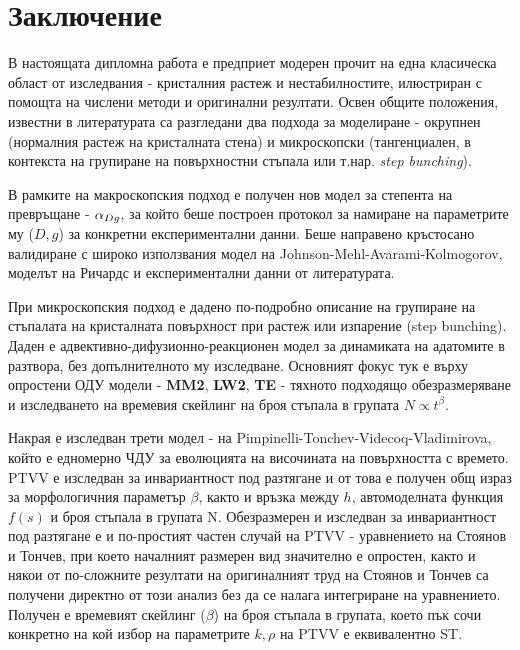 \section{Заключение}
В настоящата дипломна работа е предприет модерен прочит на една класическа област от изследвания - кристалния растеж и нестабилностите, илюстриран с помощта на числени методи и оригинални резултати. Освен общите положения, известни в литературата са разгледани два подхода за моделиране - окрупнен (нормалния растеж на кристалната стена) и микроскопски (тангенциален, в контекста на групиране на повърхностни стъпала или т.нар. \textit{step bunching}).

В рамките на макроскопския подход е получен нов модел за степента на превръщане - $\alpha_{Dg}$, за който беше построен протокол за намиране на параметрите му ($D, g$) за конкретни експериментални данни. Беше направено кръстосано валидиране с широко използвания модел на Johnson-Mehl-Avarami-Kolmogorov, моделът на Ричардс и експериментални данни от литературата.

При микроскопския подход е дадено по-подробно описание на групиране на стъпалата на кристалната повърхност при растеж или изпарение (step bunching). Даден е адвективно-дифузионно-реакционен модел за динамиката на адатомите в разтвора, без допълнителното му изследване. Основният фокус тук е върху опростени ОДУ модели - \textbf{MM2}, \textbf{LW2}, \textbf{TE} - тяхното подходящо обезразмеряване и изследването на времевия скейлинг на броя стъпала в групата $N \propto t^\beta$. 

Накрая е изследван трети модел - на Pimpinelli-Tonchev-Videcoq-Vladimirova, който е едномерно ЧДУ за еволюцията на височината на повърхността с времето.  PTVV е изследван за инвариантност под разтягане и от това е получен общ израз за морфологичния параметър $\beta$, както и връзка между $h$, автомоделната функция $f(s)$ и броя стъпала в групата N. Обезразмерен и изследван за инвариантност под разтягане е и по-простият частен случай на PTVV - уравнението на Стоянов и Тончев, при което началният размерен вид значително е опростен, както и някои от по-сложните резултати на оригиналният труд на Стоянов и Тончев са получени директно от този анализ без да се налага интегриране на уравнението. Получен е времевият скейлинг ($\beta$) на броя стъпала в групата, което пък сочи конкретно на кой избор на параметрите $k, \rho$ на PTVV е еквивалентно ST.
